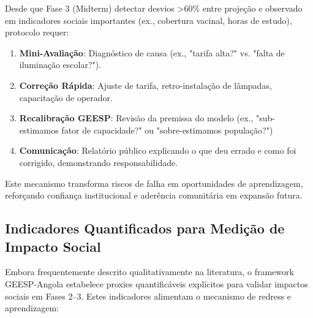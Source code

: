 \documentclass[12pt, a4paper]{article}
\begin{document}
{{{{{{{{{{{{Desde que Fase 3 (Midterm) detectar desvios >60\% entre projeção e observado em indicadores sociais importantes (ex., cobertura vacinal, horas de estudo), protocolo requer:

\begin{enumerate}
\item \textbf{Mini-Avaliação}: Diagnóstico de causa (ex., "tarifa alta?" vs. "falta de iluminação escolar?").
\item \textbf{Correção Rápida}: Ajuste de tarifa, retro-instalação de lâmpadas, capacitação de operador.
\item \textbf{Recalibração GEESP}: Revisão da premissa do modelo (ex., "sub-estimamos fator de capacidade?" ou "sobre-estimamos população?")
\item \textbf{Comunicação}: Relatório público explicando o que deu errado e como foi corrigido, demonstrando responsabilidade.
\end{enumerate}

Este mecanismo transforma riscos de falha em oportunidades de aprendizagem, reforçando confiança institucional e aderência comunitária em expansão futura.

\subsection{Indicadores Quantificados para Medição de Impacto Social}

Embora frequentemente descrito qualitativamente na literatura, o framework GEESP-Angola estabelece proxies quantificáveis explícitos para validar impactos sociais em Fases 2--3. Estes indicadores alimentam o mecanismo de redress e aprendizagem:

}}}}}}}}}}}}
\end{document}
